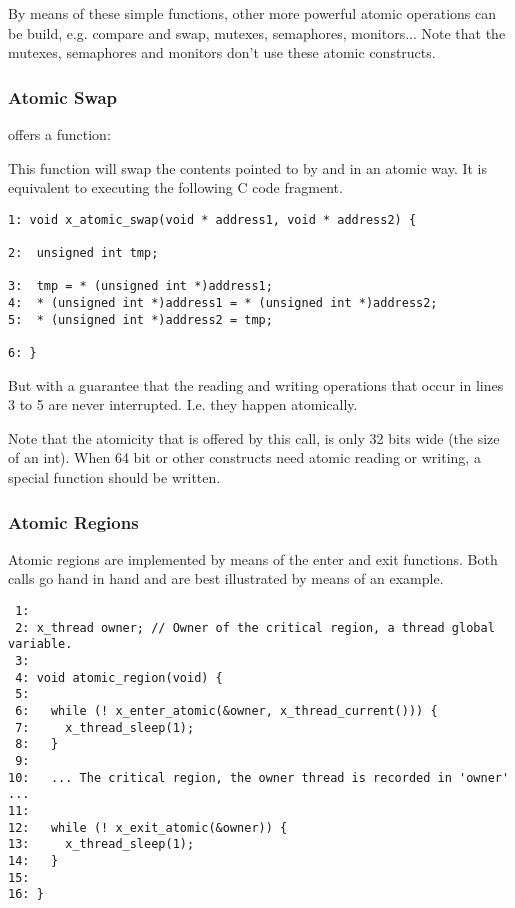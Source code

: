 By means of these simple functions, other more powerful atomic operations
can be build, e.g. compare and swap, mutexes, semaphores, monitors... Note
that the \oswald mutexes, semaphores and monitors don't use these atomic
constructs.

\subsubsection{Atomic Swap}

\oswald offers a function: 


This function will swap the contents pointed to by  and
 in an atomic way. It is equivalent to executing the
following C code fragment.

\bcode
\begin{verbatim}
1: void x_atomic_swap(void * address1, void * address2) {

2:  unsigned int tmp;

3:  tmp = * (unsigned int *)address1;
4:  * (unsigned int *)address1 = * (unsigned int *)address2;
5:  * (unsigned int *)address2 = tmp;

6: }
\end{verbatim}
\ecode

But with a guarantee that the reading and writing operations that occur in
lines 3 to 5 are never interrupted. I.e. they happen atomically.

Note that the atomicity that is offered by this call, is only 32 bits wide
(the size of an int). When 64 bit or other constructs need atomic reading or
writing, a special function should be written.

\subsubsection{Atomic Regions}

Atomic regions are implemented by means of the enter and exit functions.
Both calls go hand in hand and are best illustrated by means of an example.

\bcode
\begin{verbatim}
 1:
 2: x_thread owner; // Owner of the critical region, a thread global variable.
 3:
 4: void atomic_region(void) {
 5:
 6:   while (! x_enter_atomic(&owner, x_thread_current())) {
 7:     x_thread_sleep(1);
 8:   }
 9:
10:   ... The critical region, the owner thread is recorded in 'owner' ...
11:
12:   while (! x_exit_atomic(&owner)) {
13:     x_thread_sleep(1);
14:   }
15:
16: }
\end{verbatim}
\ecode

